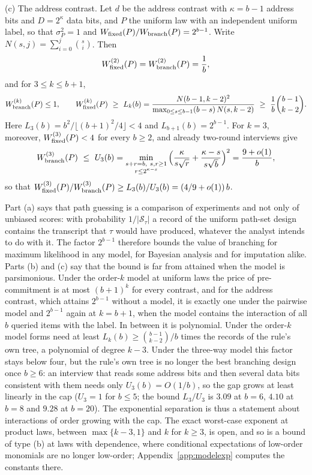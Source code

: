 \begin{theorem}
\textup{(c) The address contrast.} Let $d$ be the address contrast with
$\kappa=b-1$ address bits and $D=2^\kappa$ data bits, and $P$ the uniform law
with an independent uniform label, so that $\sigma_P^2=1$ and
$W_{\rm fixed}(P)/W_{\rm branch}(P)=2^{b-1}$. Write
$N(s,j)=\sum_{i=0}^{j}\binom si$. Then
\[
 W^{(2)}_{\rm fixed}(P)=W^{(2)}_{\rm branch}(P)=\frac1b,
\]
and for $3\le k\le b+1$,
\[
 W^{(k)}_{\rm branch}(P)\le1,\qquad
 W^{(k)}_{\rm fixed}(P)\ \ge\ L_k(b)=\frac{N(b-1,k-2)^2}{\max_{0\le s\le b-1}(b-s)\,N(s,k-2)}\ \ge\ \frac1b\binom{b-1}{k-2}.
\]
Here $L_3(b)=b^2/\lfloor(b+1)^2/4\rfloor<4$ and $L_{b+1}(b)=2^{b-1}$. For
$k=3$, moreover, $W^{(3)}_{\rm fixed}(P)<4$ for every $b\ge2$, and already
two-round interviews give
\[
 W^{(3)}_{\rm branch}(P)\ \le\ U_3(b)=\min_{\substack{s+r=b,\ s,r\ge1\\ r\le2^{\kappa-s}}}
   \Big(\frac{\kappa}{s\sqrt r}+\frac{\kappa-s}{s\sqrt b}\Big)^2=\frac{9+o(1)}{b},
\]
so that $W^{(3)}_{\rm fixed}(P)/W^{(3)}_{\rm branch}(P)\ge L_3(b)/U_3(b)=(4/9+o(1))\,b$.
\end{theorem}

Part (a) says that path guessing is a comparison of experiments and not only
of unbiased scores: with probability $1/|\mathcal S_\tau|$ a record of the
uniform path-set design contains the transcript that $\tau$ would have
produced, whatever the analyst intends to do with it. The factor $2^{b-1}$
therefore bounds the value of branching for maximum likelihood in any model,
for Bayesian analysis and for imputation alike. Parts (b) and (c) say that
the bound is far from attained when the model is parsimonious. Under the
order-$k$ model at uniform laws the price of pre-commitment is at most
$(b+1)^k$ for every contrast, and for the address contrast, which attains
$2^{b-1}$ without a model, it is exactly one under the pairwise model and
$2^{b-1}$ again at $k=b+1$, when the model contains the interaction of all
$b$ queried items with the label. In between it is polynomial. Under the
order-$k$ model forms need at least $L_k(b)\ge\binom{b-1}{k-2}/b$ times the
records of the rule's own tree, a polynomial of degree $k-3$. Under the
three-way model this factor stays below four, but the rule's own tree is no
longer the best branching design once $b\ge6$: an interview that reads some
address bits and then several data bits consistent with them needs only
$U_3(b)=O(1/b)$, so the gap grows at least linearly in the cap ($U_3=1$ for
$b\le5$; the bound $L_3/U_3$ is $3.09$ at $b=6$, $4.10$ at $b=8$ and $9.28$ at
$b=20$). The exponential separation is thus a statement about interactions
of order growing with the cap. The exact worst-case exponent at product laws,
between $\max\{k-3,1\}$ and $k$ for $k\ge3$, is open, and so is a bound of
type (b) at laws with dependence, where conditional expectations of
low-order monomials are no longer low-order; Appendix~\ref{app:modelexp}
computes the constants there.


